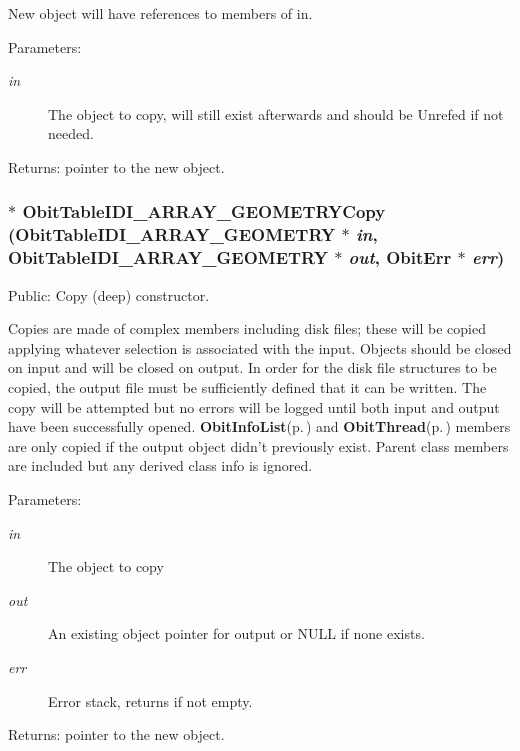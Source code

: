 New object will have references to members of in. \begin{Desc}
\item[Parameters:]
\begin{description}
\item[{\em in}]The object to copy, will still exist afterwards and should be Unrefed if not needed. \end{description}
\end{Desc}
\begin{Desc}
\item[Returns:]pointer to the new object. \end{Desc}
\subsubsection{$\ast$ Obit\-Table\-IDI\_\-ARRAY\_\-GEOMETRYCopy ({\bf Obit\-Table\-IDI\_\-ARRAY\_\-GEOMETRY} $\ast$ {\em in}, {\bf Obit\-Table\-IDI\_\-ARRAY\_\-GEOMETRY} $\ast$ {\em out}, {\bf Obit\-Err} $\ast$ {\em err})}\label{ObitTableIDI__ARRAY__GEOMETRY_8h_a14}


Public: Copy (deep) constructor. 

Copies are made of complex members including disk files; these will be copied applying whatever selection is associated with the input. Objects should be closed on input and will be closed on output. In order for the disk file structures to be copied, the output file must be sufficiently defined that it can be written. The copy will be attempted but no errors will be logged until both input and output have been successfully opened. {\bf Obit\-Info\-List}{\rm (p.\,\pageref{structObitInfoList})} and {\bf Obit\-Thread}{\rm (p.\,\pageref{structObitThread})} members are only copied if the output object didn't previously exist. Parent class members are included but any derived class info is ignored. \begin{Desc}
\item[Parameters:]
\begin{description}
\item[{\em in}]The object to copy \item[{\em out}]An existing object pointer for output or NULL if none exists. \item[{\em err}]Error stack, returns if not empty. \end{description}
\end{Desc}
\begin{Desc}
\item[Returns:]pointer to the new object. \end{Desc}
